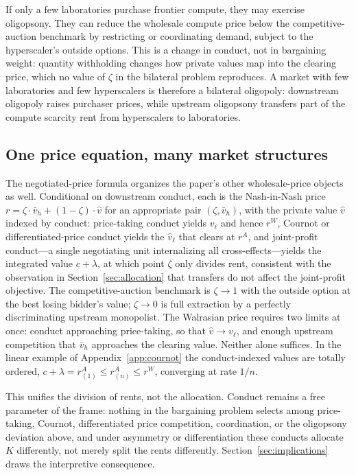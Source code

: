 \documentclass[11pt]{article}
\begin{document}
If only a few laboratories purchase frontier compute, they may exercise oligopsony. They can reduce the wholesale compute price below the competitive-auction benchmark by restricting or coordinating demand, subject to the hyperscaler's outside options. This is a change in conduct, not in bargaining weight: quantity withholding changes how private values map into the clearing price, which no value of $\zeta$ in the bilateral problem reproduces. A market with few laboratories and few hyperscalers is therefore a bilateral oligopoly: downstream oligopoly raises purchaser prices, while upstream oligopsony transfers part of the compute scarcity rent from hyperscalers to laboratories.

\subsection*{One price equation, many market structures}

The negotiated-price formula organizes the paper's other wholesale-price objects as well. Conditional on downstream conduct, each is the Nash-in-Nash price $r=\zeta\cdot\bar v_h+(1-\zeta)\cdot\widehat v$ for an appropriate pair $(\zeta,\bar v_h)$, with the private value $\widehat v$ indexed by conduct: price-taking conduct yields $v_\ell$ and hence $r^W$, Cournot or differentiated-price conduct yields the $\widehat v_\ell$ that clears at $r^A$, and joint-profit conduct---a single negotiating unit internalizing all cross-effects---yields the integrated value $c+\lambda$, at which point $\zeta$ only divides rent, consistent with the observation in Section~\ref{sec:allocation} that transfers do not affect the joint-profit objective. The competitive-auction benchmark is $\zeta\rightarrow1$ with the outside option at the best losing bidder's value; $\zeta\rightarrow0$ is full extraction by a perfectly discriminating upstream monopolist. The Walrasian price requires two limits at once: conduct approaching price-taking, so that $\widehat v\rightarrow v_\ell$, and enough upstream competition that $\bar v_h$ approaches the clearing value. Neither alone suffices. In the linear example of Appendix~\ref{app:cournot} the conduct-indexed values are totally ordered, $c+\lambda=r^A_{(1)}\leq r^A_{(n)}\leq r^W$, converging at rate $1/n$.

This unifies the division of rents, not the allocation. Conduct remains a free parameter of the frame: nothing in the bargaining problem selects among price-taking, Cournot, differentiated price competition, coordination, or the oligopsony deviation above, and under asymmetry or differentiation these conducts allocate $K$ differently, not merely split the rents differently. Section~\ref{sec:implications} draws the interpretive consequence.
\end{document}
